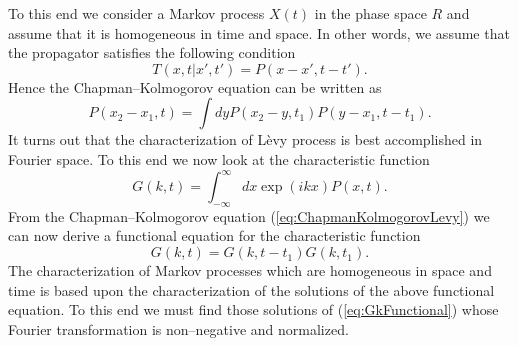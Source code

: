 To this end we consider a Markov process $X(t)$ in the phase space $R$ and
assume that it is homogeneous in time and space. In other words, we assume
that the propagator satisfies the following condition
\begin{displaymath}
T(x,t|x',t') = P(x-x',t-t').
\end{displaymath}
Hence the Chapman--Kolmogorov equation can be written as
\begin{equation}
\label{eq:ChapmanKolmogorovLevy}
  P(x_2 -x_1,t) = \int dy P(x_2 -y,t_1) P(y-x_1,t-t_1).
\end{equation}
It turns out that the characterization of L\`evy process is best accomplished
in Fourier space. To this end  we now look at the characteristic function
\begin{displaymath}
  G(k,t) = \int_{-\infty}^{\infty} dx \exp(ikx) P(x,t).
\end{displaymath}
From the Chapman--Kolmogorov equation (\ref{eq:ChapmanKolmogorovLevy}) 
we can now derive a functional equation for the characteristic function
\begin{equation}
\label{eq:GkFunctional}
  G(k,t) = G(k,t-t_1) G(k,t_1).
\end{equation}
The characterization of Markov processes which are homogeneous in space and
time is based upon the characterization of the solutions of the above
functional equation. To this end we must find those  solutions of 
(\ref{eq:GkFunctional}) whose Fourier transformation is non--negative and 
normalized.

